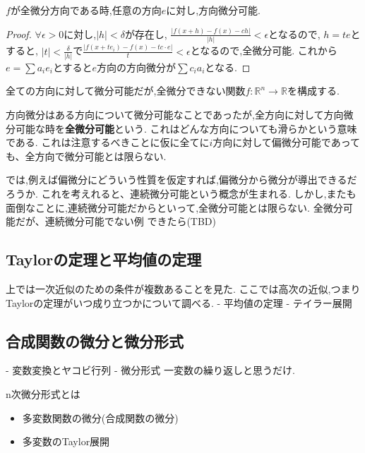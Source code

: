 \documentclass{ujarticle}
\begin{document}
\begin{prop}
  $f$が全微分方向である時,任意の方向$e$に対し,方向微分可能.
\end{prop}
\begin{proof}
$\forall \epsilon >0$に対し,$|h| < \delta$が存在し,
$\frac{|f(x+h)-f(x) - ch|}{|h|} < \epsilon$となるので,
$h = te$とすると,
$|t| < \frac{\delta}{|h|}$で$\frac{|f(x+te_i)-f(x) - tc \cdot e|}{t} < \epsilon$となるので,全微分可能.
これから$e = \sum a_i e_i$とすると$e$方向の方向微分が$\sum c_i a_i$となる.
\end{proof}

\begin{epl}
全ての方向に対して微分可能だが,全微分できない関数$f:\mathbb{R}^n \to \mathbb{R}$を構成する.
\end{epl}
方向微分はある方向について微分可能なことであったが,全方向に対して方向微分可能な時を\textbf{全微分可能}という.
これはどんな方向についても滑らかという意味である.
これは注意するべきことに仮に全てに$i$方向に対して偏微分可能であっても、全方向で微分可能とは限らない.



では,例えば偏微分にどういう性質を仮定すれば,偏微分から微分が導出できるだろうか.
これを考えれると、連続微分可能という概念が生まれる.
しかし,またも面倒なことに,連続微分可能だからといって,全微分可能とは限らない.
全微分可能だが、連続微分可能でない例
できたら(TBD)


\subsection{Taylorの定理と平均値の定理}
上では一次近似のための条件が複数あることを見た.
ここでは高次の近似,つまりTaylorの定理がいつ成り立つかについて調べる.
- 平均値の定理
- テイラー展開


\subsection{合成関数の微分と微分形式}

- 変数変換とヤコビ行列
- 微分形式
  一変数の繰り返しと思うだけ.

n次微分形式とは


\begin{exs}
  \begin{itemize}
    \item 多変数関数の微分(合成関数の微分)
    \item 多変数のTaylor展開
  \end{itemize}
\end{exs}
\end{document}
